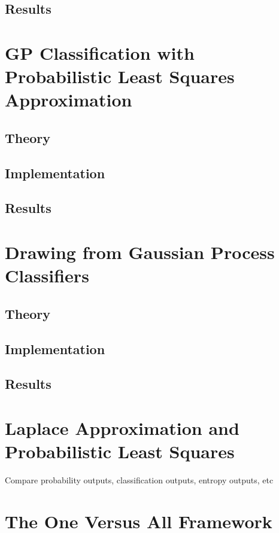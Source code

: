		\subsection{Results}
		
	\section{GP Classification with Probabilistic Least Squares Approximation}

		\subsection{Theory}
		
		\subsection{Implementation}
			
		\subsection{Results}
				
	\section{Drawing from Gaussian Process Classifiers}
				
		\subsection{Theory}
		
		\subsection{Implementation}
			
		\subsection{Results}

	\section{Laplace Approximation and Probabilistic Least Squares}
	
		Compare probability outputs, classification outputs, entropy outputs, etc

	\section{The One Versus All Framework}
	
